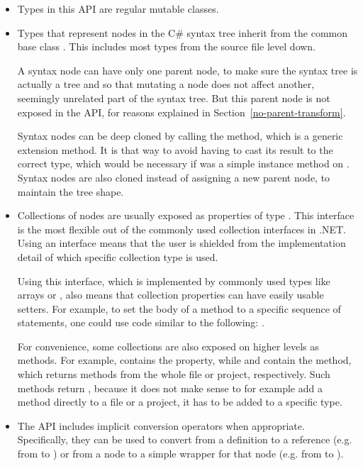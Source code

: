 \begin{itemize}
	
\item Types in this \ac{API} are regular mutable classes.

\item Types that represent nodes in the C\# syntax tree inherit from the common base class . This includes most types from the source file level down.

\label{no-parent-syntax}
A syntax node can have only one parent node, to make sure the syntax tree is actually a tree and so that mutating a node does not affect another, seemingly unrelated part of the syntax tree. But this parent node is not exposed in the \ac{API}, for reasons explained in Section~\ref{no-parent-transform}.

Syntax nodes can be deep cloned by calling the  method, which is a generic extension method. It is that way to avoid having to cast its result to the correct type, which would be necessary if  was a simple instance method on . Syntax nodes are also cloned instead of assigning a new parent node, to maintain the tree shape.

\item Collections of nodes are usually exposed as properties of type . This interface is the most flexible out of the commonly used collection interfaces in .NET. Using an interface means that the user is shielded from the implementation detail of which specific collection type is used.

Using this interface, which is implemented by commonly used types like arrays or , also means that collection properties can have easily usable setters. For example, to set the body of a method to a specific sequence of statements, one could use code similar to the following: .

For convenience, some collections are also exposed on higher levels as methods. For example,  contains the  property, while  and  contain the  method, which returns methods from the whole file or project, respectively. Such methods return , because it does not make sense to for example add a method directly to a file or a project, it has to be added to a specific type.

\item The \ac{API} includes implicit conversion operators when appropriate. Specifically, they can be used to convert from a definition to a reference (e.g. from  to ) or from a node to a simple wrapper for that node (e.g. from  to ).


\end{itemize}
